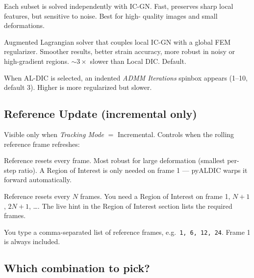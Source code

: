 \begin{description}[leftmargin=1.2cm,style=nextline]
  \item[Local DIC]
    Each subset is solved independently with IC-GN. Fast, preserves
    sharp local features, but sensitive to noise. Best for high-
    quality images and small deformations.
  \item[AL-DIC]
    Augmented Lagrangian solver that couples local IC-GN with a
    global FEM regularizer. Smoother results, better strain accuracy,
    more robust in noisy or high-gradient regions. $\sim 3\times$
    slower than Local DIC. Default.
\end{description}

When AL-DIC is selected, an indented \emph{ADMM Iterations} spinbox
appears (1--10, default 3). Higher is more regularized but slower.

\subsection{Reference Update (incremental only)}

Visible only when \emph{Tracking Mode} $=$ Incremental. Controls
when the rolling reference frame refreshes:

\begin{description}[leftmargin=1.2cm,style=nextline]
  \item[Every Frame]
    Reference resets every frame. Most robust for large deformation
    (smallest per-step ratio). A Region of Interest is only needed on
    frame 1 --- pyALDIC warps it forward automatically.
  \item[Every N Frames]
    Reference resets every $N$ frames. You need a Region of Interest
    on frame 1, $N+1$, $2N+1$, \ldots. The live hint in the Region of
    Interest section lists the required frames.
  \item[Custom Frames]
    You type a comma-separated list of reference frames, e.g.\
    \texttt{1, 6, 12, 24}. Frame 1 is always included.
\end{description}

\subsection{Which combination to pick?}

